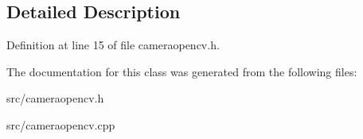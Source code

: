 \subsection{Detailed Description}


Definition at line 15 of file cameraopencv.\+h.



The documentation for this class was generated from the following files\+:\begin{DoxyCompactItemize}
\item 
src/cameraopencv.\+h\item 
src/cameraopencv.\+cpp\end{DoxyCompactItemize}
